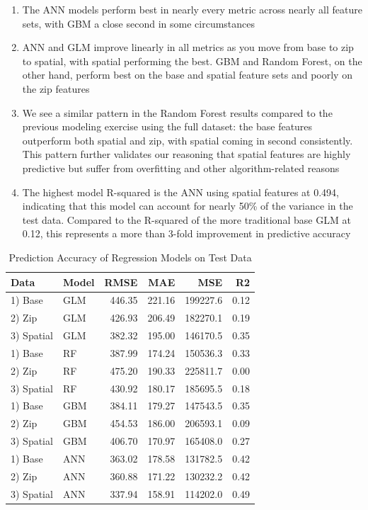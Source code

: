 \documentclass[conference,final,]{IEEEtran}
\providecommand{\tightlist}{%
  \setlength{\itemsep}{0pt}\setlength{\parskip}{0pt}}
\begin{document}
\begin{enumerate}
\def\labelenumi{\arabic{enumi})}
\tightlist
\item
  The ANN models perform best in nearly every metric across nearly all
  feature sets, with GBM a close second in some circumstances
\item
  ANN and GLM improve linearly in all metrics as you move from base to
  zip to spatial, with spatial performing the best. GBM and Random
  Forest, on the other hand, perform best on the base and spatial
  feature sets and poorly on the zip features
\item
  We see a similar pattern in the Random Forest results compared to the
  previous modeling exercise using the full dataset: the base features
  outperform both spatial and zip, with spatial coming in second
  consistently. This pattern further validates our reasoning that
  spatial features are highly predictive but suffer from overfitting and
  other algorithm-related reasons
\item
  The highest model R-squared is the ANN using spatial features at
  0.494, indicating that this model can account for nearly 50\% of the
  variance in the test data. Compared to the R-squared of the more
  traditional base GLM at 0.12, this represents a more than 3-fold
  improvement in predictive accuracy
\end{enumerate}

\begin{table}

\caption{\label{tab:Reg Model RMSE Compare}\label{tab:RegModelTable} Prediction Accuracy of Regression Models on Test Data}
\centering
\begin{tabular}[t]{l|l|r|r|r|r}
\hline
Data & Model & RMSE & MAE & MSE & R2\\
\hline
1) Base & GLM & 446.35 & 221.16 & 199227.6 & 0.12\\
\hline
2) Zip & GLM & 426.93 & 206.49 & 182270.1 & 0.19\\
\hline
3) Spatial & GLM & 382.32 & 195.00 & 146170.5 & 0.35\\
\hline
1) Base & RF & 387.99 & 174.24 & 150536.3 & 0.33\\
\hline
2) Zip & RF & 475.20 & 190.33 & 225811.7 & 0.00\\
\hline
3) Spatial & RF & 430.92 & 180.17 & 185695.5 & 0.18\\
\hline
1) Base & GBM & 384.11 & 179.27 & 147543.5 & 0.35\\
\hline
2) Zip & GBM & 454.53 & 186.00 & 206593.1 & 0.09\\
\hline
3) Spatial & GBM & 406.70 & 170.97 & 165408.0 & 0.27\\
\hline
1) Base & ANN & 363.02 & 178.58 & 131782.5 & 0.42\\
\hline
2) Zip & ANN & 360.88 & 171.22 & 130232.2 & 0.42\\
\hline
3) Spatial & ANN & 337.94 & 158.91 & 114202.0 & 0.49\\
\hline
\end{tabular}
\end{table}
\end{document}
